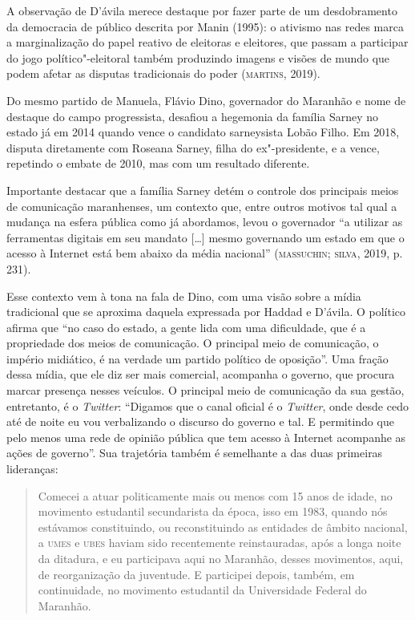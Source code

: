 A observação de D'ávila merece destaque por fazer parte de um
desdobramento da democracia de público descrita por Manin (1995): o
ativismo nas redes marca a marginalização do papel reativo de eleitoras
e eleitores, que passam a participar do jogo político"-eleitoral também
produzindo imagens e visões de mundo que podem afetar as disputas
tradicionais do poder (\textsc{martins}, 2019).

Do mesmo partido de Manuela, Flávio Dino, governador do Maranhão e nome
de destaque do campo progressista, desafiou a hegemonia da família
Sarney no estado já em 2014 quando vence o candidato sarneysista Lobão
Filho. Em 2018, disputa diretamente com Roseana Sarney, filha do
ex"-presidente, e a vence, repetindo o embate de 2010, mas com um
resultado diferente.

Importante destacar que a família Sarney detém o controle dos principais
meios de comunicação maranhenses, um contexto que, entre outros motivos
tal qual a mudança na esfera pública como já abordamos, levou o
governador ``a utilizar as ferramentas digitais em seu mandato {[}\ldots{}{]}
mesmo governando um estado em que o acesso à Internet está bem abaixo da
média nacional'' (\textsc{massuchin}; \textsc{silva}, 2019, p.\,231).

Esse contexto vem à tona na fala de Dino, com uma visão sobre a mídia
tradicional que se aproxima daquela expressada por Haddad e D'ávila. O
político afirma que ``no caso do estado, a gente lida com uma
dificuldade, que é a propriedade dos meios de comunicação. O principal
meio de comunicação, o império midiático, é na verdade um partido
político de oposição''. Uma fração dessa mídia, que ele diz ser mais
comercial, acompanha o governo, que procura marcar presença nesses
veículos. O principal meio de comunicação da sua gestão, entretanto, é o
\emph{Twitter}: ``Digamos que o canal oficial é o \emph{Twitter}, onde
desde cedo até de noite eu vou verbalizando o discurso do governo e tal.
E permitindo que pelo menos uma rede de opinião pública que tem acesso à
Internet acompanhe as ações de governo''. Sua trajetória também é
semelhante a das duas primeiras lideranças:

\begin{quote}
Comecei a atuar politicamente mais ou menos com 15 anos de idade, no
movimento estudantil secundarista da época, isso em 1983, quando nós
estávamos constituindo, ou reconstituindo as entidades de âmbito
nacional, a \textsc{umes} e \textsc{ubes} haviam sido recentemente reinstauradas, após a
longa noite da ditadura, e eu participava aqui no Maranhão, desses
movimentos, aqui, de reorganização da juventude. E participei depois,
também, em continuidade, no movimento estudantil da Universidade Federal
do Maranhão.
\end{quote}

